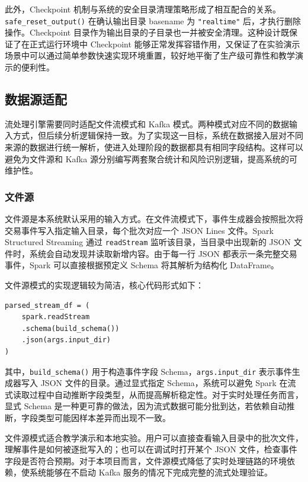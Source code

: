 \documentclass[12pt,hyperref,a4paper,UTF8]{ctexart}
\begin{document}
此外，Checkpoint 机制与系统的安全目录清理策略形成了相互配合的关系。\texttt{safe\_reset\_output()} 在确认输出目录 basename 为 \texttt{"realtime"} 后，才执行删除操作。Checkpoint 目录作为输出目录的子目录也一并被安全清理。这种设计既保证了在正式运行环境中 Checkpoint 能够正常发挥容错作用，又保证了在实验演示场景中可以通过简单参数快速实现环境重置，较好地平衡了生产级可靠性和教学演示的便利性。

\subsection{数据源适配}

流处理引擎需要同时适配文件流模式和 Kafka 模式。两种模式对应不同的数据输入方式，但后续分析逻辑保持一致。为了实现这一目标，系统在数据接入层对不同来源的数据进行统一解析，使进入处理阶段的数据都具有相同字段结构。这样可以避免为文件源和 Kafka 源分别编写两套聚合统计和风险识别逻辑，提高系统的可维护性。

\subsubsection{文件源}

文件源是本系统默认采用的输入方式。在文件流模式下，事件生成器会按照批次将交易事件写入指定输入目录，每个批次对应一个 JSON Lines 文件。Spark Structured Streaming 通过 \texttt{readStream} 监听该目录，当目录中出现新的 JSON 文件时，系统会自动发现并读取新增内容。由于每一行 JSON 都表示一条完整交易事件，Spark 可以直接根据预定义 Schema 将其解析为结构化 DataFrame。

文件源模式的实现逻辑较为简洁，核心代码形式如下：

\begin{verbatim}
parsed_stream_df = (
    spark.readStream
    .schema(build_schema())
    .json(args.input_dir)
)
\end{verbatim}

其中，\texttt{build\_schema()} 用于构造事件字段 Schema，\texttt{args.input\_dir} 表示事件生成器写入 JSON 文件的目录。通过显式指定 Schema，系统可以避免 Spark 在流式读取过程中自动推断字段类型，从而提高解析稳定性。对于实时处理任务而言，显式 Schema 是一种更可靠的做法，因为流式数据可能分批到达，若依赖自动推断，字段类型可能因样本差异而出现不一致。

文件源模式适合教学演示和本地实验。用户可以直接查看输入目录中的批次文件，理解事件是如何被逐批写入的；也可以在调试时打开某个 JSON 文件，检查事件字段是否符合预期。对于本项目而言，文件源模式降低了实时处理链路的环境依赖，使系统能够在不启动 Kafka 服务的情况下完成完整的流式处理验证。
\end{document}
